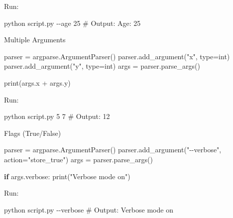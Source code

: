 \documentclass[
  letterpaper,
  DIV=11,
  numbers=noendperiod]{scrreprt}
\newenvironment{Shaded}{\begin{snugshade}}{\end{snugshade}}
\newcommand{\AttributeTok}[1]{\textcolor[rgb]{0.40,0.45,0.13}{#1}}
\newcommand{\BuiltInTok}[1]{\textcolor[rgb]{0.00,0.23,0.31}{#1}}
\newcommand{\CommentTok}[1]{\textcolor[rgb]{0.37,0.37,0.37}{#1}}
\newcommand{\ControlFlowTok}[1]{\textcolor[rgb]{0.00,0.23,0.31}{\textbf{#1}}}
\newcommand{\ExtensionTok}[1]{\textcolor[rgb]{0.00,0.23,0.31}{#1}}
\newcommand{\NormalTok}[1]{\textcolor[rgb]{0.00,0.23,0.31}{#1}}
\newcommand{\OperatorTok}[1]{\textcolor[rgb]{0.37,0.37,0.37}{#1}}
\newcommand{\StringTok}[1]{\textcolor[rgb]{0.13,0.47,0.30}{#1}}
\begin{document}
Run:

\begin{Shaded}
\begin{Highlighting}[]
\ExtensionTok{python}\NormalTok{ script.py }\AttributeTok{{-}{-}age}\NormalTok{ 25}
\CommentTok{\# Output: Age: 25}
\end{Highlighting}
\end{Shaded}

Multiple Arguments

\begin{Shaded}
\begin{Highlighting}[]
\NormalTok{parser }\OperatorTok{=}\NormalTok{ argparse.ArgumentParser()}
\NormalTok{parser.add\_argument(}\StringTok{"x"}\NormalTok{, }\BuiltInTok{type}\OperatorTok{=}\BuiltInTok{int}\NormalTok{)}
\NormalTok{parser.add\_argument(}\StringTok{"y"}\NormalTok{, }\BuiltInTok{type}\OperatorTok{=}\BuiltInTok{int}\NormalTok{)}
\NormalTok{args }\OperatorTok{=}\NormalTok{ parser.parse\_args()}

\BuiltInTok{print}\NormalTok{(args.x }\OperatorTok{+}\NormalTok{ args.y)}
\end{Highlighting}
\end{Shaded}

Run:

\begin{Shaded}
\begin{Highlighting}[]
\ExtensionTok{python}\NormalTok{ script.py 5 7}
\CommentTok{\# Output: 12}
\end{Highlighting}
\end{Shaded}

Flags (True/False)

\begin{Shaded}
\begin{Highlighting}[]
\NormalTok{parser }\OperatorTok{=}\NormalTok{ argparse.ArgumentParser()}
\NormalTok{parser.add\_argument(}\StringTok{"{-}{-}verbose"}\NormalTok{, action}\OperatorTok{=}\StringTok{"store\_true"}\NormalTok{)}
\NormalTok{args }\OperatorTok{=}\NormalTok{ parser.parse\_args()}

\ControlFlowTok{if}\NormalTok{ args.verbose:}
    \BuiltInTok{print}\NormalTok{(}\StringTok{"Verbose mode on"}\NormalTok{)}
\end{Highlighting}
\end{Shaded}

Run:

\begin{Shaded}
\begin{Highlighting}[]
\ExtensionTok{python}\NormalTok{ script.py }\AttributeTok{{-}{-}verbose}
\CommentTok{\# Output: Verbose mode on}
\end{Highlighting}
\end{Shaded}
\end{document}
